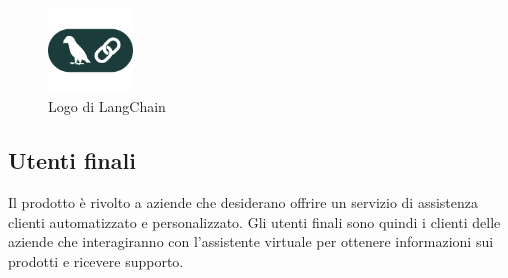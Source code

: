 \begin{figure}[H]
    \centering
    \includegraphics[width=0.2\textwidth]{img/lang-chain.png}
    \caption{Logo di LangChain}
    \label{fig:langchain_logo}
\end{figure}


\subsection{Utenti finali}
Il prodotto è rivolto a aziende che desiderano offrire un servizio di assistenza 
clienti automatizzato e personalizzato. Gli utenti finali sono quindi i clienti 
delle aziende che interagiranno con l’assistente virtuale per ottenere 
informazioni sui prodotti e ricevere supporto.
